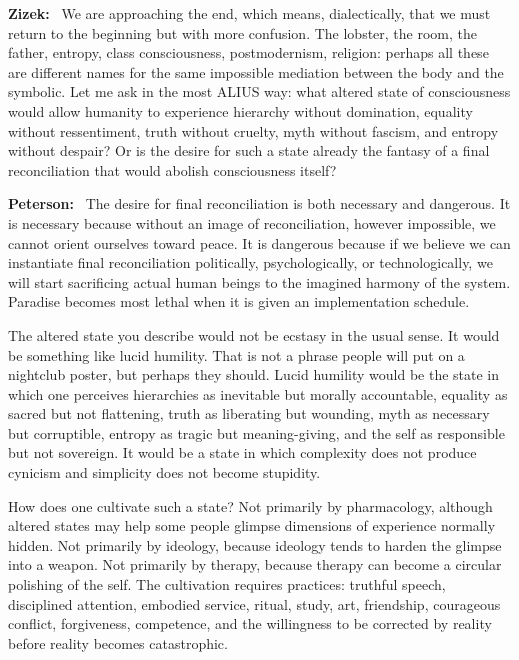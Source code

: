 \documentclass[a4paper,11pt]{article}
\newenvironment{question}{\par\noindent\color{ALIUSRed}\textbf{Zizek:}\ }{\par}
\newenvironment{answer}{\par\noindent\color{black}\textbf{Peterson:}\ }{\par}
\begin{document}
\begin{question}
We are approaching the end, which means, dialectically, that we must return to the beginning but with more confusion. The lobster, the room, the father, entropy, class consciousness, postmodernism, religion: perhaps all these are different names for the same impossible mediation between the body and the symbolic. Let me ask in the most ALIUS way: what altered state of consciousness would allow humanity to experience hierarchy without domination, equality without ressentiment, truth without cruelty, myth without fascism, and entropy without despair? Or is the desire for such a state already the fantasy of a final reconciliation that would abolish consciousness itself?
\end{question}

\begin{answer}
The desire for final reconciliation is both necessary and dangerous. It is necessary because without an image of reconciliation, however impossible, we cannot orient ourselves toward peace. It is dangerous because if we believe we can instantiate final reconciliation politically, psychologically, or technologically, we will start sacrificing actual human beings to the imagined harmony of the system. Paradise becomes most lethal when it is given an implementation schedule.

The altered state you describe would not be ecstasy in the usual sense. It would be something like lucid humility. That is not a phrase people will put on a nightclub poster, but perhaps they should. Lucid humility would be the state in which one perceives hierarchies as inevitable but morally accountable, equality as sacred but not flattening, truth as liberating but wounding, myth as necessary but corruptible, entropy as tragic but meaning-giving, and the self as responsible but not sovereign. It would be a state in which complexity does not produce cynicism and simplicity does not become stupidity.

How does one cultivate such a state? Not primarily by pharmacology, although altered states may help some people glimpse dimensions of experience normally hidden. Not primarily by ideology, because ideology tends to harden the glimpse into a weapon. Not primarily by therapy, because therapy can become a circular polishing of the self. The cultivation requires practices: truthful speech, disciplined attention, embodied service, ritual, study, art, friendship, courageous conflict, forgiveness, competence, and the willingness to be corrected by reality before reality becomes catastrophic.


\end{answer}
\end{document}
